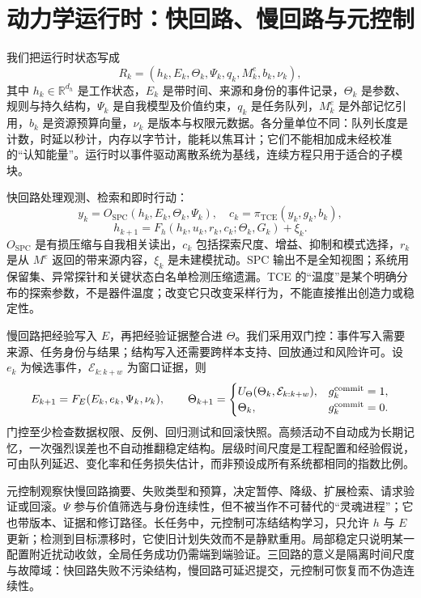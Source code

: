 \section{动力学运行时：快回路、慢回路与元控制}
\label{sec:section_9357}

我们把运行时状态写成
\[
R_k=(h_k,E_k,\Theta_k,\Psi_k,q_k,M^e_k,b_k,\nu_k),
\]
其中 $h_k\in\mathbb R^{d_h}$ 是工作状态，$E_k$ 是带时间、来源和身份的事件记录，$\Theta_k$ 是参数、规则与持久结构，$\Psi_k$ 是自我模型及价值约束，$q_k$ 是任务队列，$M^e_k$ 是外部记忆引用，$b_k$ 是资源预算向量，$\nu_k$ 是版本与权限元数据。各分量单位不同：队列长度是计数，时延以秒计，内存以字节计，能耗以焦耳计；它们不能相加成未经校准的“认知能量”。运行时以事件驱动离散系统为基线，连续方程只用于适合的子模块。

快回路处理观测、检索和即时行动：
\[
y_k=O_{\mathrm{SPC}}(h_k,E_k,\Theta_k,\Psi_k),\quad
c_k=\pi_{\mathrm{TCE}}(y_k,g_k,b_k),
\]
\[
h_{k+1}=F_h(h_k,u_k,r_k,c_k;\Theta_k,G_k)+\xi_k.
\]
$O_{\mathrm{SPC}}$ 是有损压缩与自我相关读出，$c_k$ 包括探索尺度、增益、抑制和模式选择，$r_k$ 是从 $M^e$ 返回的带来源内容，$\xi_k$ 是未建模扰动。SPC 输出不是全知视图；系统用保留集、异常探针和关键状态白名单检测压缩遗漏。TCE 的“温度”是某个明确分布的探索参数，不是器件温度；改变它只改变采样行为，不能直接推出创造力或稳定性。

慢回路把经验写入 $E$，再把经验证据整合进 $\Theta$。我们采用双门控：事件写入需要来源、任务身份与结果；结构写入还需要跨样本支持、回放通过和风险许可。设 $e_k$ 为候选事件，$\mathcal E_{k:k+w}$ 为窗口证据，则
\[
E_{k+1}=F_E(E_k,e_k,\Psi_k,\nu_k),\qquad
\Theta_{k+1}=\begin{cases}U_\Theta(\Theta_k,\mathcal E_{k:k+w}),&g_k^{\rm commit}=1,\\\Theta_k,&g_k^{\rm commit}=0.\end{cases}
\]
门控至少检查数据权限、反例、回归测试和回滚快照。高频活动不自动成为长期记忆，一次强烈误差也不自动推翻稳定结构。层级时间尺度是工程配置和经验假说，可由队列延迟、变化率和任务损失估计，而非预设成所有系统都相同的指数比例。

元控制观察快慢回路摘要、失败类型和预算，决定暂停、降级、扩展检索、请求验证或回滚。$\Psi$ 参与价值筛选与身份连续性，但不被当作不可替代的“灵魂进程”；它也带版本、证据和修订路径。长任务中，元控制可冻结结构学习，只允许 $h$ 与 $E$ 更新；检测到目标漂移时，它使旧计划失效而不是静默重用。局部稳定只说明某一配置附近扰动收敛，全局任务成功仍需端到端验证。三回路的意义是隔离时间尺度与故障域：快回路失败不污染结构，慢回路可延迟提交，元控制可恢复而不伪造连续性。

